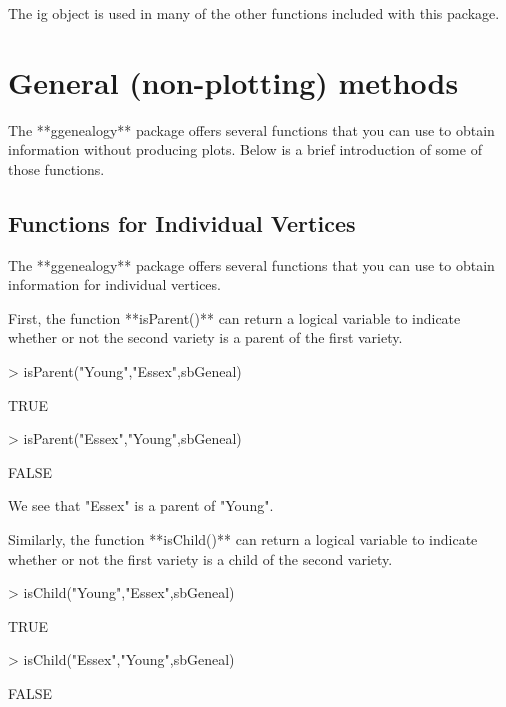 \documentclass{article}
\numberwithin{equation}{section} %
\begin{document}
The ig object is used in many of the other functions included with this package. 

\section{General (non-plotting) methods}

The **ggenealogy** package offers several functions that you can use to obtain information without producing plots. Below is a brief introduction of some of those functions.

\subsection{Functions for Individual Vertices}

The **ggenealogy** package offers several functions that you can use to obtain information for individual vertices.

First, the function **isParent()** can return a logical variable to indicate whether or not the second variety is a parent of the first variety.

\begin{Schunk}
\begin{Sinput}
> isParent("Young","Essex",sbGeneal)
\end{Sinput}
\begin{Soutput}
[1] TRUE
\end{Soutput}
\begin{Sinput}
> isParent("Essex","Young",sbGeneal)
\end{Sinput}
\begin{Soutput}
[1] FALSE
\end{Soutput}
\end{Schunk}

We see that "Essex" is a parent of "Young".

Similarly, the function **isChild()** can return a logical variable to indicate whether or not the first variety is a child of the second variety.

\begin{Schunk}
\begin{Sinput}
> isChild("Young","Essex",sbGeneal)
\end{Sinput}
\begin{Soutput}
[1] TRUE
\end{Soutput}
\begin{Sinput}
> isChild("Essex","Young",sbGeneal)
\end{Sinput}
\begin{Soutput}
[1] FALSE
\end{Soutput}
\end{Schunk}
\end{document}
